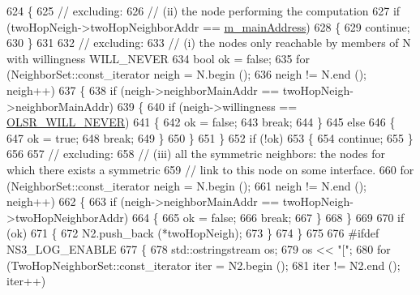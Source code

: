 \begin{DoxyCode}
624     \{
625       \textcolor{comment}{// excluding:}
626       \textcolor{comment}{// (ii)  the node performing the computation}
627       \textcolor{keywordflow}{if} (twoHopNeigh->twoHopNeighborAddr == \hyperlink{classns3_1_1olsr_1_1RoutingProtocol_a58cc50ed5d1039aab603e90e318aabfb}{m\_mainAddress})
628         \{
629           \textcolor{keywordflow}{continue};
630         \}
631 
632       \textcolor{comment}{//  excluding:}
633       \textcolor{comment}{// (i)   the nodes only reachable by members of N with willingness WILL\_NEVER}
634       \textcolor{keywordtype}{bool} ok = \textcolor{keyword}{false};
635       \textcolor{keywordflow}{for} (NeighborSet::const\_iterator neigh = N.begin ();
636            neigh != N.end (); neigh++)
637         \{
638           \textcolor{keywordflow}{if} (neigh->neighborMainAddr == twoHopNeigh->neighborMainAddr)
639             \{
640               \textcolor{keywordflow}{if} (neigh->willingness == \hyperlink{olsr-routing-protocol_8cc_a146d2c103abd49bdfad44b4424769696}{OLSR\_WILL\_NEVER})
641                 \{
642                   ok = \textcolor{keyword}{false};
643                   \textcolor{keywordflow}{break};
644                 \}
645               \textcolor{keywordflow}{else}
646                 \{
647                   ok = \textcolor{keyword}{true};
648                   \textcolor{keywordflow}{break};
649                 \}
650             \}
651         \}
652       \textcolor{keywordflow}{if} (!ok)
653         \{
654           \textcolor{keywordflow}{continue};
655         \}
656 
657       \textcolor{comment}{// excluding:}
658       \textcolor{comment}{// (iii) all the symmetric neighbors: the nodes for which there exists a symmetric}
659       \textcolor{comment}{//       link to this node on some interface.}
660       \textcolor{keywordflow}{for} (NeighborSet::const\_iterator neigh = N.begin ();
661            neigh != N.end (); neigh++)
662         \{
663           \textcolor{keywordflow}{if} (neigh->neighborMainAddr == twoHopNeigh->twoHopNeighborAddr)
664             \{
665               ok = \textcolor{keyword}{false};
666               \textcolor{keywordflow}{break};
667             \}
668         \}
669 
670       \textcolor{keywordflow}{if} (ok)
671         \{
672           N2.push\_back (*twoHopNeigh);
673         \}
674     \}
675 
676 \textcolor{preprocessor}{#ifdef NS3\_LOG\_ENABLE}
677   \{
678     std::ostringstream os;
679     os << \textcolor{stringliteral}{"["};
680     \textcolor{keywordflow}{for} (TwoHopNeighborSet::const\_iterator iter = N2.begin ();
681          iter != N2.end (); iter++)

\end{DoxyCode}
